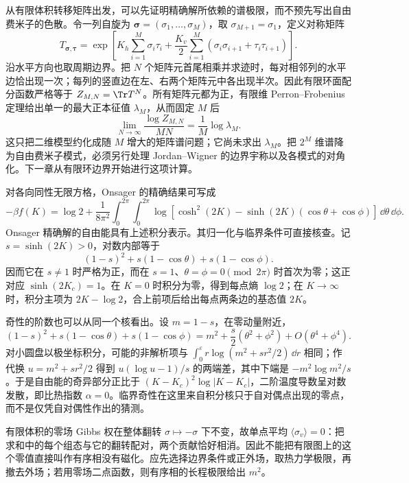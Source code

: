 从有限体积转移矩阵出发，可以先证明精确解所依赖的谱极限，而不预先写出自由费米子的色散。令一列自旋为 \(\boldsymbol\sigma=(\sigma_1,\ldots,\sigma_M)\)，取 \(\sigma_{M+1}=\sigma_1\)，定义对称矩阵
\begin{equation}
T_{\boldsymbol\sigma,\boldsymbol\tau}
=\exp\!\left[
K_h\sum_{i=1}^M\sigma_i\tau_i
+\frac{K_v}{2}\sum_{i=1}^M
(\sigma_i\sigma_{i+1}+\tau_i\tau_{i+1})
\right].
\label{eq:phys-sm-transfer-finite}
\end{equation}
沿水平方向也取周期边界。把 \(N\) 个矩阵元首尾相乘并求迹时，每对相邻列的水平边恰出现一次；每列的竖直边在左、右两个矩阵元中各出现半次。因此有限环面配分函数严格等于 \(Z_{M,N}=\Tr T^N\)。所有矩阵元都为正，有限维 Perron--Frobenius 定理给出单一的最大正本征值 \(\lambda_M\)，从而固定 \(M\) 后
\[
\lim_{N\to\infty}\frac{\log Z_{M,N}}{MN}
=\frac1M\log\lambda_M.
\]
这只把二维模型约化成随 \(M\) 增大的矩阵谱问题；它尚未求出 \(\lambda_M\)。把 \(2^M\) 维谱降为自由费米子模式，必须另行处理 Jordan--Wigner 的边界宇称以及各模式的对角化。下一章从有限环边界开始进行这项计算。

对各向同性无限方格，Onsager 的精确结果可写成
\begin{equation}
-\beta f(K)=\log2+\frac{1}{8\pi^2}
\int_0^{2\pi}\!\!\int_0^{2\pi}
\log\!\left[\cosh^2(2K)
-\sinh(2K)(\cos\theta+\cos\phi)\right]
\,\dd\theta\,\dd\phi .
\label{eq:phys-sm-onsager-free-energy}
\end{equation}
Onsager 精确解的自由能具有上述积分表示。其归一化与临界条件可直接核查。记 \(s=\sinh(2K)>0\)，对数内部等于
\[
(1-s)^2+s(1-\cos\theta)+s(1-\cos\phi).
\]
因而它在 \(s\ne1\) 时严格为正，而在 \(s=1\)、\(\theta=\phi=0\pmod{2\pi}\) 时首次为零；这正对应 \(\sinh(2K_c)=1\)。在 \(K=0\) 时积分为零，得到每点熵 \(\log2\)；在 \(K\to\infty\) 时，积分主项为 \(2K-\log2\)，合上前项后给出每点两条边的基态值 \(2K\)。

奇性的阶数也可以从同一个核看出。设 \(m=1-s\)，在零动量附近，
\[
(1-s)^2+s(1-\cos\theta)+s(1-\cos\phi)
=m^2+\frac{s}{2}(\theta^2+\phi^2)+O(\theta^4+\phi^4).
\]
对小圆盘以极坐标积分，可能的非解析项与
\(\int_0^\varepsilon r\log(m^2+sr^2/2)\,\dd r\)
相同；作代换 \(u=m^2+sr^2/2\) 得到 \(u(\log u-1)/s\) 的两端差，其中下端是 \(-m^2\log m^2/s\)。于是自由能的奇异部分正比于 \((K-K_c)^2\log|K-K_c|\)，二阶温度导数呈对数发散，即比热指数 \(\alpha=0\)。临界奇性在这里来自积分核只于自对偶点出现的零点，而不是仅凭自对偶性作出的猜测。

有限体积的零场 Gibbs 权在整体翻转 \(\sigma\mapsto-\sigma\) 下不变，故单点平均 \(\langle\sigma_v\rangle=0\)：把求和中的每个组态与它的翻转配对，两个贡献恰好相消。因此不能把有限图上的这个零值直接叫作有序相没有磁化。应先选择边界条件或正外场，取热力学极限，再撤去外场；若用零场二点函数，则有序相的长程极限给出 \(m^2\)。

